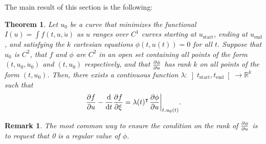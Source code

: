 \documentclass{article}
\theoremstyle{plain}
\newtheorem{theorem}{Theorem}
\theoremstyle{plain}
\newtheorem{remark}{Remark}
\theoremstyle{nonumberplain}
\theoremstyle{empty}
\newcommand{\R}{\mathbb{R}}
\newcommand{\tr}{\intercal}
\newcommand{\tstart}{\mathrm{start}}
\newcommand{\tend}{\mathrm{end}}
\DeclarePairedDelimiter\eval{.}{\rvert}
\begin{document}
The main result of this section is the following:

\begin{theorem}\label{lagrangeholonomic}
Let $u_0$ be a curve that minimizes the functional $I(u) = \int f(t,u,\dot u)$ as $u$ ranges over $C^1$ curves starting at $u_\tstart$, ending at $u_\tend$, and satisfying the $k$ cartesian equations $\phi(t,u(t)) = 0$ for all $t$. Suppose that $u_0$ is $C^2$, that $f$ and $\phi$ are $C^2$ in an open set containing all points of the form $(t,u_0,\dot u_0)$ and $(t,u_0)$ respectively, and that $\diffp \phi u$ has rank $k$ on all points of the form $(t,u_0)$. Then, there exists a continuous function $\lambda \colon \left]t_\tstart, t_\tend\right[ \to \R^k$ such that
\begin{equation}\label{eq:lagrangeholonomic}
\diffp f u - \diff*{\diffp f \xi}t = \lambda(t)^\tr \eval*{\diffp{\phi}{u}}_{t,u_0(t)}.
\end{equation}
\end{theorem}

\begin{remark}
The most common way to ensure the condition on the rank of $\diffp \phi u$ is to request that 0 is a regular value of $\phi$.
\end{remark}
\end{document}
